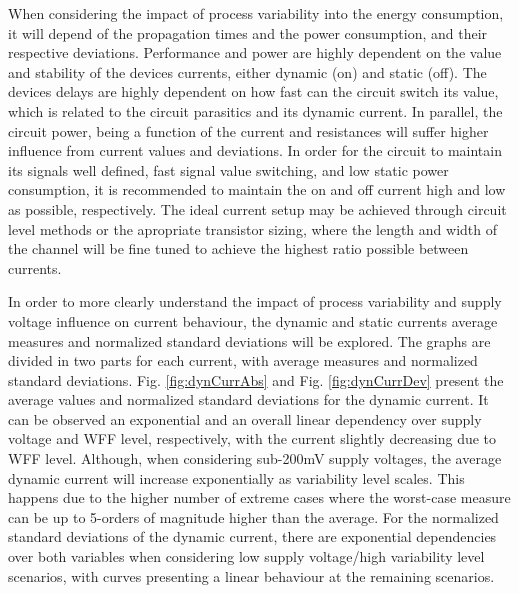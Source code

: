 \documentclass[pgmicro,diss,english]{iiufrgs}
\begin{document}
    When considering the impact of process variability into the energy consumption, it will depend of the propagation times and the power consumption, and their respective deviations. Performance and power are highly dependent on the value and stability of the devices currents, either dynamic (on) and static (off). The devices delays are highly dependent on how fast can the circuit switch its value, which is related to the circuit parasitics and its dynamic current. In parallel, the circuit power, being a function of the current and resistances will suffer higher influence from current values and deviations. In order for the circuit to maintain its signals well defined, fast signal value switching, and low static power consumption, it is recommended to maintain the on and off current high and low as possible, respectively. The ideal current setup may be achieved through circuit level methods or the apropriate transistor sizing, where the length and width of the channel will be fine tuned to achieve the highest ratio possible between currents.

In order to more clearly understand the impact of process variability and supply voltage influence on current behaviour, the dynamic and static currents average measures and normalized standard deviations will be explored. The graphs are divided in two parts for each current, with average measures and normalized standard deviations. Fig. \ref{fig:dynCurrAbs} and Fig. \ref{fig:dynCurrDev} present the average values and normalized standard deviations for the dynamic current. It can be observed an exponential and an overall linear dependency over supply voltage and WFF level, respectively, with the current slightly decreasing due to WFF level. Although, when considering sub-200mV supply voltages, the average dynamic current will increase exponentially as variability level scales. This happens due to the higher number of extreme cases where the worst-case measure can be up to 5-orders of magnitude higher than the average. For the normalized standard deviations of the dynamic current, there are exponential dependencies over both variables when considering low supply voltage/high variability level scenarios, with curves presenting a linear behaviour at the remaining scenarios.
\end{document}
